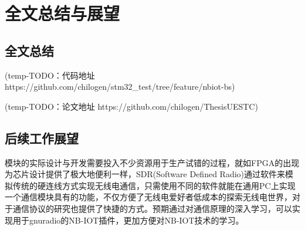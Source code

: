 \chapter{全文总结与展望}

\section{全文总结}
(temp-TODO：代码地址 https://github.com/chilogen/stm32\_test/tree/feature/nbiot-bs)

(temp-TODO：论文地址 https://github.com/chilogen/ThesisUESTC)


\section{后续工作展望}

模块的实际设计与开发需要投入不少资源用于生产试错的过程，就如FPGA的出现为芯片设计提供了极大地便利一样，SDR(Software Defined Radio)通过软件来模拟传统的硬连线方式实现无线电通信，只需使用不同的软件就能在通用PC上实现一个通信模块具有的功能，不仅方便了无线电爱好者低成本的探索无线电世界，对于通信协议的研究也提供了快捷的方式。预期通过对通信原理的深入学习，可以实现用于gnuradio的NB-IOT插件，更加方便对NB-IOT技术的学习。